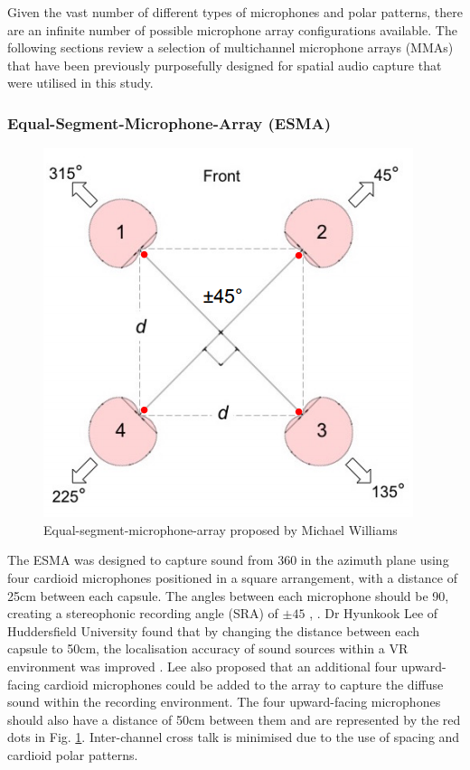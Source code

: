 		Given the vast number of different types of microphones and polar patterns, there are an infinite number of possible microphone array configurations available. The following sections review a selection of multichannel microphone arrays (MMAs) that have been previously purposefully designed for spatial audio capture that were utilised in this study.


		\subsubsection{Equal-Segment-Microphone-Array (ESMA)}
			\begin{figure}[h!]
			\begin{center}
				\includegraphics[width = 0.4\linewidth]{images/mic/esma.png}
				\caption{Equal-segment-microphone-array proposed by Michael Williams \cite{esma}}
				\label{esmaSchematic}
			\end{center}
			\end{figure}
			The ESMA was designed to capture sound from 360\textdegree{} in the azimuth plane using four cardioid microphones positioned in a square arrangement, with a distance of 25cm between each capsule. The angles between each microphone should be 90\textdegree{}, creating a stereophonic recording angle (SRA) of $ \pm45 $\textdegree{} \cite{williamsMMAD}, \cite{williams91}. Dr Hyunkook Lee of Huddersfield University found that by changing the distance between each capsule to 50cm, the localisation accuracy of sound sources within a VR environment was improved \cite{esma}. Lee also proposed that an additional four upward-facing cardioid microphones could be added to the array to capture the diffuse sound within the recording environment. The four upward-facing microphones should also have a distance of 50cm between them and are represented by the red dots in Fig. \ref{esmaSchematic}. Inter-channel cross talk is minimised due to the use of spacing and cardioid polar patterns.\\

